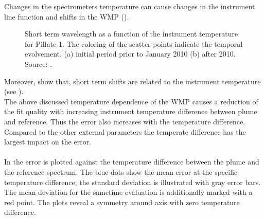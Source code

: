 Changes in the spectrometers temperature can cause changes in the instrument line function and shifts in the WMP (\citep{pinardi2007influence}). 
\begin{figure}		
	\caption{Short term wavelength as a function of the instrument temperature for Pillate 1. The coloring of the scatter points indicate the temporal evolvement. (a) initial period prior to January 2010 (b) after 2010. Source: \cite{WarnachSimon}.}
	\label{fig:shorttermshift}
\end{figure}
Moreover, \cite{WarnachSimon} show that, short term shifts are related to the instrument temperature (see ).\\
The above discussed temperature dependence of the WMP causes a reduction of the fit quality with increasing instrument temperature difference between plume and reference. Thus the  error also increases with the temperature difference.
Compared to the other external parameters the temperate difference has the largest impact on the  error.\\
\\
In  the  error is plotted against the temperature difference between the plume and the reference spectrum. The blue dots show the mean  error at the specific temperature difference, the standard deviation is illustrated with gray error bars. The mean  deviation for the sametime evaluation is additionally marked with a red point. The plots reveal a symmetry around axis with zero temperature difference.
